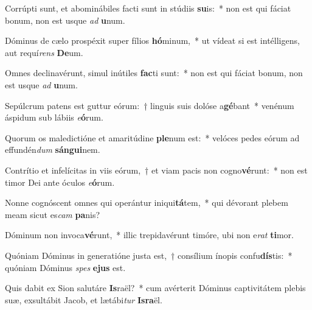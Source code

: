 \item Corrúpti sunt, et abominábiles facti sunt in stúdiis \textbf{su}is:~* non est qui fáciat bonum, non est usque \textit{ad} \textbf{u}num.
\item Dóminus de cælo prospéxit super fílios \textbf{hó}minum,~* ut vídeat si est intélligens, aut requí\textit{rens} \textbf{De}um.
\item Omnes declinavérunt, simul inútiles \textbf{fac}ti sunt:~* non est qui fáciat bonum, non est usque \textit{ad} \textbf{u}num.
\item Sepúlcrum patens est guttur eórum:~† linguis suis dolóse a\textbf{gé}bant~* venénum áspidum sub lábiis \textit{e}\textbf{ó}rum.
\item Quorum os maledictióne et amaritúdine \textbf{ple}num est:~* velóces pedes eórum ad effundén\textit{dum} \textbf{sán}\textbf{gui}nem.
\item Contrítio et infelícitas in viis eórum,~† et viam pacis non cogno\textbf{vé}runt:~* non est timor Dei ante óculos \textit{e}\textbf{ó}rum.
\item Nonne cognóscent omnes qui operántur iniqui\textbf{tá}tem,~* qui dévorant plebem meam sicut es\textit{cam} \textbf{pa}nis?
\item Dóminum non invoca\textbf{vé}runt,~* illic trepidavérunt timóre, ubi non e\textit{rat} \textbf{ti}mor.
\item Quóniam Dóminus in generatióne justa est,~† consílium ínopis confu\textbf{dís}tis:~* quóniam Dóminus \textit{spes} \textbf{e}\textbf{jus} est.
\item Quis dabit ex Sion salutáre \textbf{Is}raël?~* cum avérterit Dóminus captivitátem plebis suæ, exsultábit Jacob, et lætábi\textit{tur} \textbf{Is}\textbf{ra}ël.
